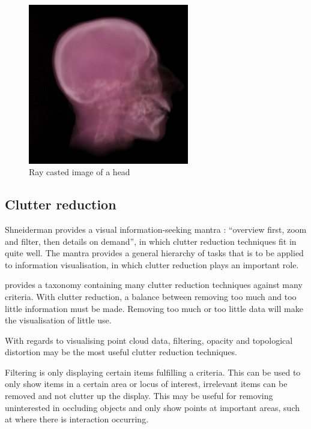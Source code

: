 \begin{figure}[h!]
  \begin{center}
    \includegraphics[width=70mm]{head_volume}
  \end{center}
  \caption{Ray casted image of a head}
  \label{fig:headvolume}
\end{figure}


\subsection{Clutter reduction}
\label{sub:clutterreduction}

Shneiderman provides a visual information-seeking mantra \citep{shneiderman96}:
``overview first, zoom and filter, then details on demand'', in which clutter
reduction techniques fit in quite well. The mantra provides a general hierarchy
of tasks that is to be applied to information visualisation, in which clutter
reduction plays an important role.

\citet{ellis07} provides a taxonomy containing many clutter reduction techniques
against many criteria. With clutter reduction, a balance between removing too
much and too little information must be made. Removing too much or too little
data will make the visualisation of little use.

With regards to visualising point cloud data, filtering, opacity and topological
distortion may be the most useful clutter reduction techniques.

Filtering is only displaying certain items fulfilling a criteria. This can be
used to only show items in a certain area or locus of interest, irrelevant items
can be removed and not clutter up the display. This may be useful for removing
uninterested in occluding objects and only show points at important areas, such
at where there is interaction occurring.

